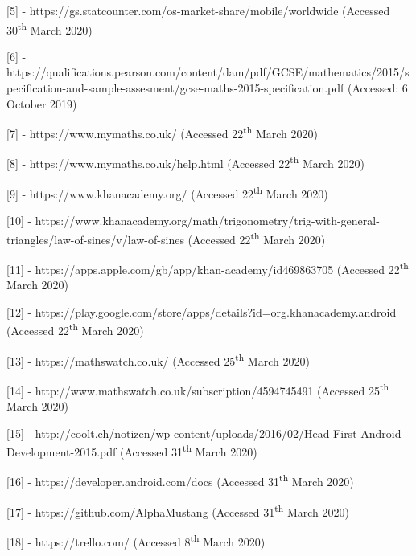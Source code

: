 \documentclass{article}
\begin{document}
[5] - https://gs.statcounter.com/os-market-share/mobile/worldwide (Accessed 30\textsuperscript{th} March 2020) \par

[6] - https://qualifications.pearson.com/content/dam/pdf/GCSE/mathematics/2015/specification-and-sample-assesment/gcse-maths-2015-specification.pdf (Accessed: 6 October 2019) \par

[7] - https://www.mymaths.co.uk/ (Accessed 22\textsuperscript{th} March 2020) \par

[8] - https://www.mymaths.co.uk/help.html (Accessed 22\textsuperscript{th} March 2020) \par

[9] - https://www.khanacademy.org/ (Accessed 22\textsuperscript{th} March 2020) \par

[10] - https://www.khanacademy.org/math/trigonometry/trig-with-general-triangles/law-of-sines/v/law-of-sines (Accessed 22\textsuperscript{th} March 2020) \par

[11] - https://apps.apple.com/gb/app/khan-academy/id469863705 (Accessed 22\textsuperscript{th} March 2020) \par

[12] - https://play.google.com/store/apps/details?id=org.khanacademy.android (Accessed 22\textsuperscript{th} March 2020) \par

[13] - https://mathswatch.co.uk/ (Accessed 25\textsuperscript{th} March 2020) \par

[14] - http://www.mathswatch.co.uk/subscription/4594745491 (Accessed 25\textsuperscript{th} March 2020) \par

[15] - http://coolt.ch/notizen/wp-content/uploads/2016/02/Head-First-Android-Development-2015.pdf (Accessed 31\textsuperscript{th} March 2020) \par

[16] - https://developer.android.com/docs (Accessed 31\textsuperscript{th} March 2020) \par

[17] - https://github.com/AlphaMustang (Accessed 31\textsuperscript{th} March 2020) \par

[18] - https://trello.com/ (Accessed 8\textsuperscript{th} March 2020) \par
\end{document}
